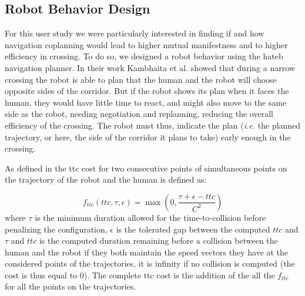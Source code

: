 \documentclass[a4paper,11pt,twoside]{StyleThese}
\begin{document}
\subsection{Robot Behavior Design}
For this user study we were particularly interested in finding if and how navigation coplanning would lead to higher mutual manifestness and to higher efficiency in crossing.
To do so, we designed a robot behavior using the \acrshort{hateb} navigation planner.
In their work Kambhaita et al. showed that during a narrow crossing the robot is able to plan that the human and the robot will choose opposite sides of the corridor. But if the robot shows its plan when it faces the human, they would have little time to react, and might also move to the same side as the robot, needing negotiation and replanning, reducing the overall efficiency of the crossing. The robot must thus, indicate the plan (\textit{i.e.} the planned trajectory, or here, the side of the corridor it plans to take) early enough in the crossing.

As defined in \cite{khambhaita_viewing_2017} the \acrshort{ttc} cost for two consecutive points of simultaneous points on the trajectory of the robot and the human is defined as:

\begin{equation}\label{eq:ttc}
f_{ttc}(ttc, \tau, \epsilon) = \max(0, \frac{\tau + \epsilon - ttc}{C^2})
\end{equation}
where $\tau$ is the minimum duration allowed for the time-to-collision before penalizing the configuration, $\epsilon$ is the tolerated gap between the computed $ttc$ and $\tau$ and $ttc$ is the computed duration remaining before a collision between the human and the robot if they both maintain the speed vectors they have at the considered points of the trajectories, it is infinity if no collision is computed (the cost is thus equal to 0). The complete \acrshort{ttc} cost is the addition of the all the $f_{ttc}$ for all the points on the trajectories.
\end{document}
